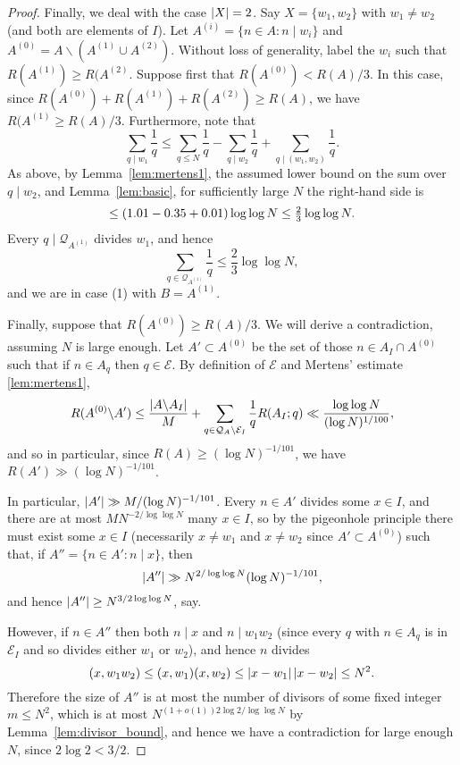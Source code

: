 \begin{proof}
Finally, we deal with the case $\left\lvert X\right\rvert=2$. Say $X=\{w_1,w_2\}$ with $w_1\neq w_2$ (and both are elements of $I$). Let $A^{(i)}=\{n\in A: n\mid w_i\}$ and $A^{(0)}=A\backslash (A^{(1)}\cup A^{(2)})$. Without loss of generality, label the $w_i$ such that $R(A^{(1)})\geq R(A^{(2)}$.  Suppose first that $R(A^{(0)})<R(A)/3$. In this case, since $R(A^{(0)})+R(A^{(1)})+R(A^{(2)})\geq R(A)$, we have $R(A^{(1)}\geq R(A)/3$. Furthermore, note that
\[\sum_{q\mid w_1}\frac{1}{q}\leq \sum_{q\leq N}\frac{1}{q}-\sum_{q\mid w_2}\frac{1}{q}+\sum_{q\mid (w_1,w_2)}\frac{1}{q}.\]
As above, by Lemma~\ref{lem:mertens1}, the assumed lower bound on the sum over $q\mid w_2$, and Lemma~\ref{lem:basic}, for sufficiently large $N$ the right-hand side is
\[\leq \left( 1.01-0.35+0.01\right)\log\log N\leq \tfrac{2}{3}\log\log N.\]
Every $q\mid \mathcal{Q}_{A^{(1)}}$ divides $w_1$, and hence
\[\sum_{q\in \mathcal{Q}_{A^{(1)}}}\frac{1}{q}\leq\frac{2}{3}\log\log N,\]
and we are in case (1) with $B=A^{(1)}$.

Finally, suppose that $R(A^{(0)})\geq R(A)/3$. We will derive a contradiction, assuming $N$ is large enough.  Let $A'\subset A^{(0)}$ be the set of those $n\in A_I\cap A^{(0)}$ such that if $n\in A_q$ then $q\in\mathcal{E}$. By definition of $\mathcal{E}$ and Mertens' estimate \ref{lem:mertens1},
  \[R(A^{(0)}\backslash A')\leq \frac{\left\lvert A\backslash A_I\right\rvert}{M}+\sum_{q\in\mathcal{Q}_A\backslash \mathcal{E}_I}\frac{1}{q}R(A_I;q)\ll \frac{\log\log N}{(\log N)^{1/100}},\]
  and so  in particular, since $R(A)\geq (\log N)^{-1/101}$, we have $R(A')\gg (\log N)^{-1/101}$.

  In particular, $\left\lvert A'\right\rvert\gg M/(\log N)^{-1/101}$. Every $n\in A'$ divides some $x\in I$, and there are at most $MN^{-2/\log\log N}$ many $x\in I$, so by the pigeonhole principle there must exist some $x\in I$ (necessarily $x\neq w_1$ and $x\neq w_2$ since $A'\subset A^{(0)}$) such that, if $A''=\{ n\in A' : n\mid x\}$, then
  \[\left\lvert A''\right\rvert\gg N^{2/\log\log N}(\log N)^{-1/101},\]
  and hence $\left\lvert A''\right\rvert\geq N^{3/2\log\log N}$, say.

  However, if $n\in A''$ then both $n\mid x$ and $n\mid w_1w_2$ (since every $q$ with $n\in A_q$ is in $\mathcal{E}_I$ and so divides either $w_1$ or $w_2$), and hence $n$ divides
  \[(x,w_1w_2)\leq (x,w_1)(x,w_2)\leq \left\lvert x-w_1\right\rvert\left\lvert x-w_2\right\rvert\leq N^2.\]
  Therefore the size of $A''$ is at most the number of divisors of some fixed integer $m\leq N^2$, which is at most $N^{(1+o(1))2\log 2/\log\log N}$ by Lemma~\ref{lem:divisor_bound}, and hence we have a contradiction for large enough $N$, since $2\log 2< 3/2$.
\end{proof}

